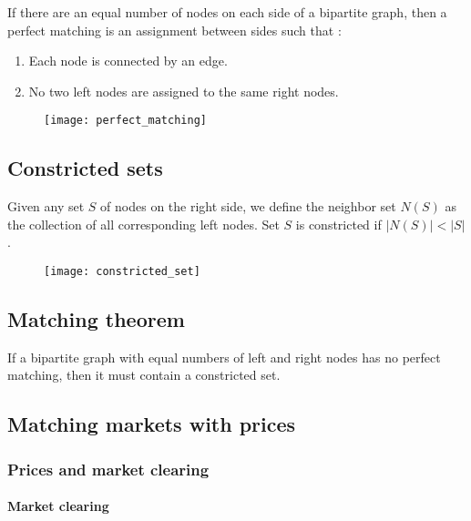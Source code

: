 If there are an equal number of nodes on each side of a bipartite graph, then a perfect matching is an assignment between sides such that :
\begin{enumerate}
\item Each node is connected by an edge.
\item No two left nodes are assigned to the same right nodes.
\end{enumerate}

\begin{figure}[H]
    \centering
    \texttt{[image: perfect\_matching]}
\end{figure}

\subsection{Constricted sets}

Given any set $S$ of nodes on the right side, we define the neighbor set $N(S)$ as the collection of all corresponding left nodes. Set $S$ is constricted if $|N(S)| < |S|$.

\begin{figure}[H]
    \centering
    \texttt{[image: constricted\_set]}
\end{figure}

\subsection{Matching theorem}

\begin{formal}
If a bipartite graph with equal numbers of left and right nodes has no perfect matching, then it must contain a constricted set.
\end{formal}

\subsection{Matching markets with prices}

\subsubsection{Prices and market clearing}

\paragraph{Market clearing}

